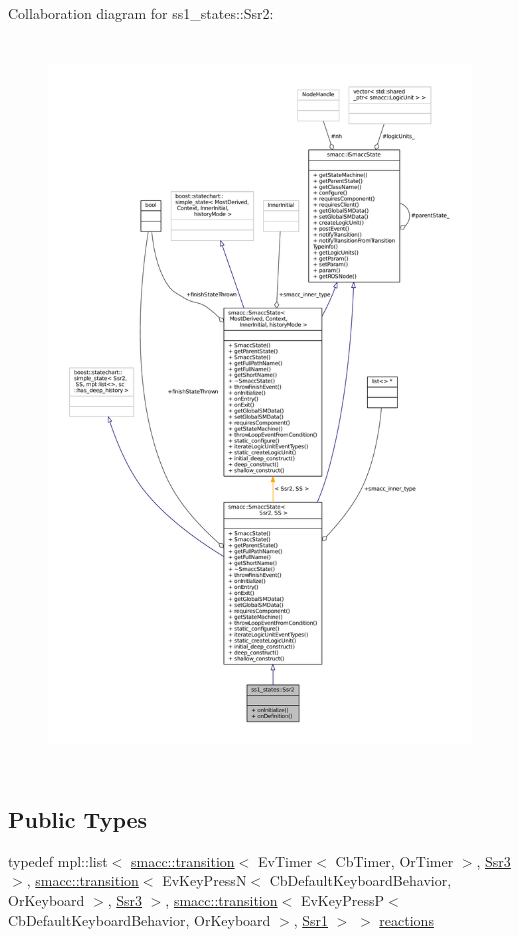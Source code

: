 Collaboration diagram for ss1\+\_\+states\+:\+:Ssr2\+:
\nopagebreak
\begin{figure}[H]
\begin{center}
\leavevmode
\includegraphics[height=550pt]{structss1__states_1_1Ssr2__coll__graph}
\end{center}
\end{figure}
\subsection*{Public Types}
\begin{DoxyCompactItemize}
\item 
typedef mpl\+::list$<$ \hyperlink{classsmacc_1_1transition}{smacc\+::transition}$<$ Ev\+Timer$<$ Cb\+Timer, Or\+Timer $>$, \hyperlink{structss1__states_1_1Ssr3}{Ssr3} $>$, \hyperlink{classsmacc_1_1transition}{smacc\+::transition}$<$ Ev\+Key\+PressN$<$ Cb\+Default\+Keyboard\+Behavior, Or\+Keyboard $>$, \hyperlink{structss1__states_1_1Ssr3}{Ssr3} $>$, \hyperlink{classsmacc_1_1transition}{smacc\+::transition}$<$ Ev\+Key\+PressP$<$ Cb\+Default\+Keyboard\+Behavior, Or\+Keyboard $>$, \hyperlink{structss1__states_1_1Ssr1}{Ssr1} $>$ $>$ \hyperlink{structss1__states_1_1Ssr2_ae46c66a6bee8f3532499185be4ce123b}{reactions}
\end{DoxyCompactItemize}
